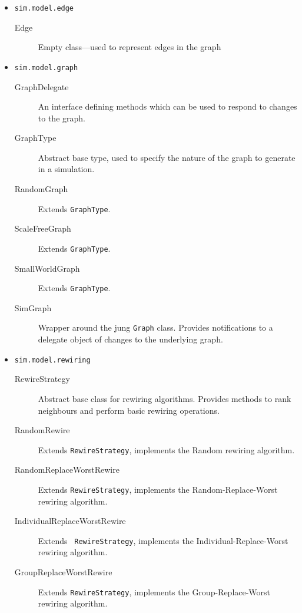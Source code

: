 \begin{itemize}
    \item {\tt sim.model.edge}

    \begin{description}
        \item[Edge] Empty class---used to represent edges in the graph
    \end{description}

    \item {\tt sim.model.graph}

    \begin{description}
        \item[GraphDelegate] An interface defining methods which can be
        used to respond to changes to the graph.
        \item[GraphType] Abstract base type, used to specify the nature
        of the graph to generate in a simulation.
        \item[RandomGraph] Extends {\tt GraphType}.
        \item[ScaleFreeGraph] Extends {\tt GraphType}.
        \item[SmallWorldGraph] Extends {\tt GraphType}.
        \item[SimGraph] Wrapper around the {\sc jung} {\tt Graph} class.
        Provides notifications to a delegate object of changes to the
        underlying graph.
    \end{description}

    \item {\tt sim.model.rewiring}

    \begin{description}
        \item[RewireStrategy] Abstract base class for rewiring
        algorithms. Provides methods to rank neighbours and perform
        basic rewiring operations.
        \item[RandomRewire] Extends {\tt RewireStrategy}, implements the
        Random rewiring algorithm.
        \item[RandomReplaceWorstRewire] Extends {\tt RewireStrategy},
        implements the \newline Random-Replace-Worst rewiring algorithm.
        \item[IndividualReplaceWorstRewire] Extends {\tt
        RewireStrategy}, implements the \newline Individual-Replace-Worst
        rewiring algorithm.
        \item[GroupReplaceWorstRewire] Extends {\tt RewireStrategy},
        implements the Group-Replace-Worst rewiring algorithm.
    \end{description}


\end{itemize}
